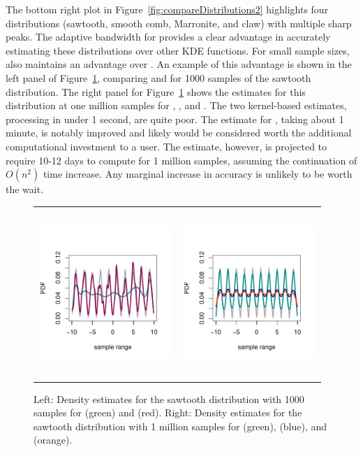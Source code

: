 The bottom right plot in Figure~\ref{fig:compareDistributions2} highlights four distributions (sawtooth, smooth comb, Marronite, and claw) with multiple sharp peaks.  The adaptive bandwidth for  provides a clear advantage in accurately estimating these distributions over other KDE functions.  For small sample sizes,  also maintains an advantage over .  An example of this advantage is shown in the left panel of Figure~\ref{fig:sawtooth}, comparing  and  for 1000 samples of the sawtooth distribution.  The right panel for Figure~\ref{fig:sawtooth} shows the estimates for this distribution at one million samples for , , and .  The two kernel-based estimates, processing in under 1 second, are quite poor.  The estimate for , taking about 1 minute, is notably improved and likely would be considered worth the additional computational investment to a user.  The  estimate, however, is projected to require 10-12 days to compute for 1 million samples, assuming the continuation of $O(n^2)$ time increase.  Any marginal increase in accuracy is unlikely to be worth the wait.

\begin{figure}[tbp]
\centering
\begin{tabular}{p{} p{}}
  \vspace{0pt} \includegraphics[width=2.0in, height=2.5in]{Figure9a.pdf} &
  \vspace{0pt} \includegraphics[width=2.0in, height=2.5in]{Figure9b.pdf} 
\end{tabular}
\caption{\label{fig:sawtooth} Left: Density estimates for the sawtooth distribution with 1000 samples for  (green) and  (red).  Right: Density estimates for the sawtooth distribution with 1 million samples for  (green),  (blue), and  (orange).}
\end{figure}

